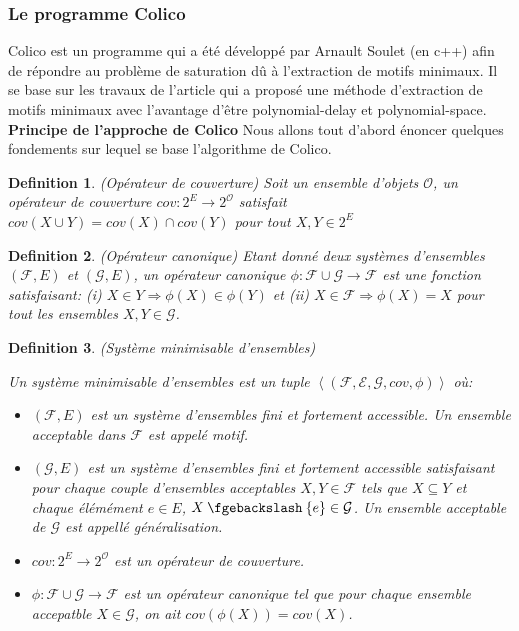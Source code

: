 \documentclass[a4paper,12pt,openany,oneside]{article}
\newcommand{\mysetminus}{\mathbin{\fgebackslash}}
\newtheorem{defn}{Definition} %
\begin{document}
\subsubsection{Le programme Colico}

Colico est un programme qui a été développé par Arnault Soulet (en c++) afin de répondre au problème de saturation dû à l'extraction de motifs minimaux. Il se base sur les travaux de l'article \cite{..} qui a proposé une méthode d'extraction de motifs minimaux avec l'avantage d'être polynomial-delay et polynomial-space. \\

\textbf{Principe de l'approche de Colico}
Nous allons tout d'abord énoncer quelques fondements sur lequel se base l'algorithme de Colico.

\begin{defn}(Opérateur de couverture)
 Soit un ensemble d'objets $\mathcal{O}$, un opérateur de couverture $cov: 2^E\rightarrow 2^\mathcal{O}$ satisfait $cov(X\cup Y)=cov(X)\cap cov(Y)$ pour tout $X,Y\in 2^E$ 
\end{defn}

\begin{defn}(Opérateur canonique)
	Etant donné deux systèmes d'ensembles $(\mathcal{F},E)$ et $(\mathcal{G},E)$, un opérateur canonique $\phi: \mathcal{F}\cup \mathcal{G}\rightarrow \mathcal{F}$ est une fonction satisfaisant: (i) $X\in Y\Rightarrow \phi(X)\in \phi(Y)$ et (ii) $X\in \mathcal{F}\Rightarrow\phi(X)=X$ pour tout les ensembles $X,Y\in \mathcal{G}$.
\end{defn}

\begin{defn}(Système minimisable d'ensembles)

Un système minimisable d'ensembles est un tuple $\left< (\mathcal{F},\mathcal{E},\mathcal{G}, cov,\phi)\right>$ où:
\begin{itemize}
	\item $(\mathcal{F},E)$ est un système d'ensembles fini et fortement accessible. Un ensemble acceptable dans $\mathcal{F}$ est appelé motif.
	\item  $(\mathcal{G},E)$ est un système d'ensembles fini et fortement accessible satisfaisant pour chaque couple d'ensembles acceptables $X,Y\in \mathcal{F}$ tels que $X\subseteq Y$ et chaque élémément $e\in E$, $X\mysetminus\{e\}\in \mathcal{G}$. Un ensemble acceptable de $\mathcal{G}$ est appellé \textit{généralisation}.
	\item $cov: 2^E\rightarrow 2^\mathcal{O}$ est un \textit{opérateur de couverture}.
	\item $\phi: \mathcal{F}\cup \mathcal{G}\rightarrow \mathcal{F}$ est un \textit{opérateur canonique} tel que pour chaque ensemble accepatble $X\in \mathcal{G}$, on ait $cov(\phi(X))=cov(X)$.
\end{itemize}

\end{defn}
\end{document}
